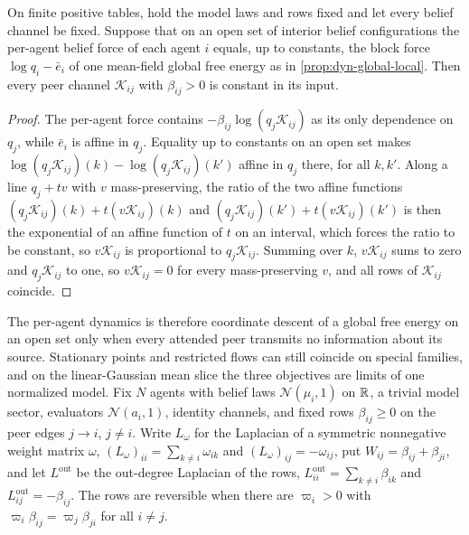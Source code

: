 On finite positive tables, hold the model laws and rows fixed and let every belief channel be fixed. Suppose that on an open set of interior belief configurations the per-agent belief force of each agent $i$ equals, up to constants, the block force $\log q_i-\bar e_i$ of one mean-field global free energy as in \cref{prop:dyn-global-local}. Then every peer channel $\mathcal K_{ij}$ with $\beta_{ij}>0$ is constant in its input.
\begin{proof}
The per-agent force contains $-\beta_{ij}\log(q_j\mathcal K_{ij})$ as its only dependence on $q_j$, while $\bar e_i$ is affine in $q_j$. Equality up to constants on an open set makes $\log(q_j\mathcal K_{ij})(k)-\log(q_j\mathcal K_{ij})(k')$ affine in $q_j$ there, for all $k,k'$. Along a line $q_j+tv$ with $v$ mass-preserving, the ratio of the two affine functions $(q_j\mathcal K_{ij})(k)+t(v\mathcal K_{ij})(k)$ and $(q_j\mathcal K_{ij})(k')+t(v\mathcal K_{ij})(k')$ is then the exponential of an affine function of $t$ on an interval, which forces the ratio to be constant, so $v\mathcal K_{ij}$ is proportional to $q_j\mathcal K_{ij}$. Summing over $k$, $v\mathcal K_{ij}$ sums to zero and $q_j\mathcal K_{ij}$ to one, so $v\mathcal K_{ij}=0$ for every mass-preserving $v$, and all rows of $\mathcal K_{ij}$ coincide.
\end{proof}

The per-agent dynamics is therefore coordinate descent of a global free energy on an open set only when every attended peer transmits no information about its source. Stationary points and restricted flows can still coincide on special families, and on the linear-Gaussian mean slice the three objectives are limits of one normalized model. Fix $N$ agents with belief laws $\mathcal N(\mu_i,1)$ on $\mathbb R$, a trivial model sector, evaluators $\mathcal N(a_i,1)$, identity channels, and fixed rows $\beta_{ij}\geq0$ on the peer edges $j\to i$, $j\neq i$. Write $L_\omega$ for the Laplacian of a symmetric nonnegative weight matrix $\omega$, $(L_\omega)_{ii}=\sum_{k\neq i}\omega_{ik}$ and $(L_\omega)_{ij}=-\omega_{ij}$, put $W_{ij}=\beta_{ij}+\beta_{ji}$, and let $L^{\mathrm{out}}$ be the out-degree Laplacian of the rows, $L^{\mathrm{out}}_{ii}=\sum_{k\neq i}\beta_{ik}$ and $L^{\mathrm{out}}_{ij}=-\beta_{ij}$. The rows are reversible when there are $\varpi_i>0$ with $\varpi_i\beta_{ij}=\varpi_j\beta_{ji}$ for all $i\neq j$.

